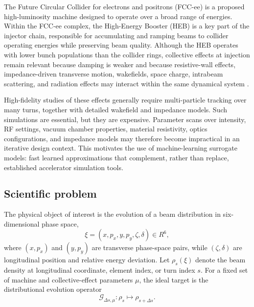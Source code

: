 \documentclass[11pt,a4paper]{article}
\begin{document}
\begin{sloppypar}
The Future Circular Collider for electrons and positrons (FCC-ee) is a proposed high-luminosity machine designed to operate over a broad range of energies. Within the FCC-ee complex, the High-Energy Booster (HEB) is a key part of the injector chain, responsible for accumulating and ramping beams to collider operating energies while preserving beam quality. Although the HEB operates with lower bunch populations than the collider rings, collective effects at injection remain relevant because damping is weaker and because resistive-wall effects, impedance-driven transverse motion, wakefields, space charge, intrabeam scattering, and radiation effects may interact within the same dynamical system \cite{gibellieri_impact_fcc_heb}.

High-fidelity studies of these effects generally require multi-particle tracking over many turns, together with detailed wakefield and impedance models. Such simulations are essential, but they are expensive. Parameter scans over intensity, RF settings, vacuum chamber properties, material resistivity, optics configurations, and impedance models may therefore become impractical in an iterative design context. This motivates the use of machine-learning surrogate models: fast learned approximations that complement, rather than replace, established accelerator simulation tools.

\subsection{Scientific problem}
The physical object of interest is the evolution of a beam distribution in six-dimensional phase space,
\begin{equation}
    \xi=(x,p_x,y,p_y,\zeta,\delta)\in R^6,
\end{equation}
where $(x,p_x)$ and $(y,p_y)$ are transverse phase-space pairs, while $(\zeta,\delta)$ are longitudinal position and relative energy deviation. Let $\rho_s(\xi)$ denote the beam density at longitudinal coordinate, element index, or turn index $s$. For a fixed set of machine and collective-effect parameters $\mu$, the ideal target is the distributional evolution operator
\begin{equation}
    \mathcal{G}_{\Delta s,\mu}: \rho_s \mapsto \rho_{s+\Delta s}.
    \label{eq:intro_distribution_operator}
\end{equation}


\end{sloppypar}
\end{document}

